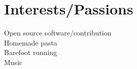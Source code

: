 \documentclass[letterpaper]{deedy-resume}
\begin{document}
\begin{minipage}[t]{0.3\textwidth}
\section{Interests/Passions}
\vspace{1em}
\textbullet{} Open source software/contribution\\
\textbullet{} Homemade pasta\\
\textbullet{} Barefoot running\\
\textbullet{} Music\\

\end{minipage} %
\hfill
\vrule
\hspace{3ex}
%
%
\end{document}
